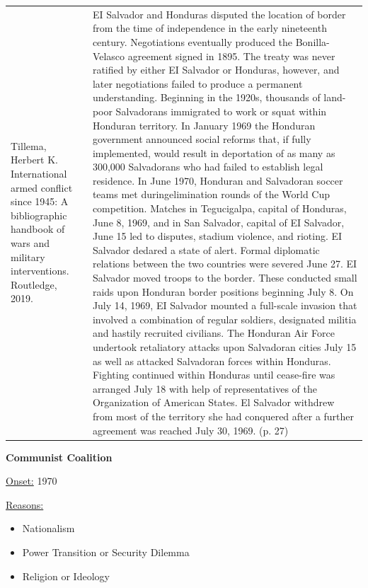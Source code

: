 {\begin{longtable}{p{}p{}}
\\
Tillema, Herbert K. International armed conflict since 1945: A bibliographic handbook of wars and military interventions. Routledge, 2019. & EI Salvador and Honduras disputed the location of border from the time of independence in the early nineteenth century. Negotiations eventually produced the Bonilla-Velasco agreement signed in 1895. The treaty was never ratified by either EI Salvador or Honduras, however, and later negotiations failed to produce a permanent understanding. Beginning in the 1920s, thousands of land-poor Salvadorans immigrated to work or squat within Honduran territory. In January 1969 the Honduran government announced social reforms that, if fully implemented, would result in deportation of as many as 300,000 Salvadorans who had failed to establish legal residence. In June 1970, Honduran and Salvadoran soccer teams met duringelimination rounds of the World Cup competition. Matches in Tegucigalpa, capital of Honduras, June 8, 1969, and in San Salvador, capital of EI Salvador, June 15 led to disputes, stadium violence, and rioting. EI Salvador dedared a state of alert. Formal diplomatic relations between the two countries were severed June 27. EI Salvador moved troops to the border. These conducted small raids upon Honduran border positions beginning July 8. On July 14, 1969, EI Salvador mounted a full-scale invasion that involved a combination of regular soldiers, designated militia and hastily recruited civilians. The Honduran Air Force undertook retaliatory attacks upon Salvadoran cities July 15 as well as attacked Salvadoran forces within Honduras. Fighting continued within Honduras until cease-fire was arranged July 18 with help of representatives of the Organization of American States. El Salvador withdrew from most of the territory she had conquered after a further agreement was reached July 30, 1969. (p. 27)
\\
\end{longtable}}
\clearpage
         \textbf{Communist Coalition} 

          \underline{Onset:} 1970         

\underline{Reasons:}
\begin{itemize}
\item Nationalism
\item Power Transition or Security Dilemma
\item Religion or Ideology
\end{itemize}

